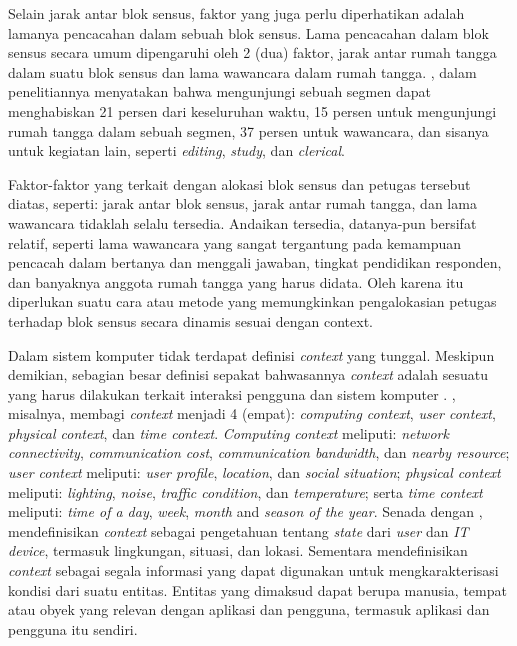 Selain jarak antar blok sensus, faktor yang juga perlu diperhatikan adalah lamanya pencacahan dalam sebuah blok sensus. Lama pencacahan dalam blok sensus secara umum dipengaruhi oleh 2 (dua) faktor, jarak antar rumah tangga dalam suatu blok sensus dan lama wawancara dalam rumah tangga. \citep{sudman_time_1965}, dalam penelitiannya menyatakan bahwa mengunjungi sebuah segmen dapat menghabiskan 21 persen dari keseluruhan waktu, 15 persen untuk mengunjungi rumah tangga dalam sebuah segmen, 37 persen untuk wawancara, dan sisanya untuk kegiatan lain, seperti \textit{editing}, \textit{study}, dan \textit{clerical}.


Faktor-faktor yang terkait dengan alokasi blok sensus dan petugas tersebut diatas, seperti: jarak antar blok sensus, jarak antar rumah tangga, dan lama wawancara tidaklah selalu tersedia. Andaikan tersedia, datanya-pun bersifat relatif, seperti lama wawancara yang sangat tergantung pada kemampuan pencacah dalam bertanya dan menggali jawaban, tingkat pendidikan responden, dan banyaknya anggota rumah tangga yang harus didata. Oleh karena itu diperlukan suatu cara atau metode yang memungkinkan pengalokasian petugas terhadap blok sensus secara dinamis sesuai dengan context.


Dalam sistem komputer tidak terdapat definisi \textit{context} yang tunggal. Meskipun demikian, sebagian besar definisi sepakat bahwasannya \textit{context} adalah sesuatu yang harus dilakukan terkait interaksi pengguna dan sistem komputer \citep{chen_survey_2000}. \citep{schilit_context-aware_1994}, misalnya, membagi \textit{context} menjadi 4 (empat): \textit{computing context}, \textit{user context}, \textit{physical context}, dan \textit{time context}. \textit{Computing context} meliputi: \textit{network connectivity}, \textit{communication cost}, \textit{communication bandwidth}, dan \textit{nearby resource}; \textit{user context} meliputi: \textit{user profile}, \textit{location}, dan \textit{social situation}; \textit{physical context} meliputi: \textit{lighting}, \textit{noise}, \textit{traffic condition}, dan \textit{temperature}; serta \textit{time context} meliputi: \textit{time of a day}, \textit{week}, \textit{month} and \textit{season of the year}. Senada dengan \citep{schilit_context-aware_1994}, \citep{schmidt_there_1999} mendefinisikan \textit{context} sebagai pengetahuan tentang \textit{state} dari \textit{user} dan \textit{IT device}, termasuk lingkungan, situasi, dan lokasi. Sementara \citep{abowd_towards_1999} mendefinisikan \textit{context} sebagai segala informasi yang dapat digunakan untuk mengkarakterisasi kondisi dari suatu entitas. Entitas yang dimaksud dapat berupa manusia, tempat atau obyek yang relevan dengan aplikasi dan pengguna, termasuk aplikasi dan pengguna itu sendiri. 


